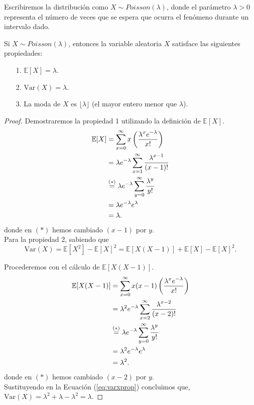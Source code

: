 \documentclass[oneside,openright,titlepage,numbers=noenddot,openany,headinclude,footinclude=true,
cleardoublepage=empty,abstractoff,BCOR=5mm,paper=a4,fontsize=12pt,main=spanish]{scrreprt}
\begin{document}
Escribiremos la distribución como $X \sim Poisson(\lambda)$, donde el parámetro $\lambda > 0$ representa el número de veces que se espera que ocurra el fenómeno durante un intervalo dado.\\


\begin{proposition}
Si $X \sim Poisson(\lambda)$, entonces la variable aleatoria $X$ satisface las siguientes propiedades:
\begin{itemize}
    \item[1.] $\mathbb{E}[X]=\lambda$.
    \item[2.] $\text{Var}(X)=\lambda$.
    \item[3.] La moda de $X$ es $\lfloor \lambda \rfloor$ (el mayor entero menor que $\lambda$).
\end{itemize}
\end{proposition}

\begin{proof}
  Demostraremos la propiedad 1 utilizando la definición de $\mathbb{E}[X]$. \\
  \begin{equation*}
  \begin{split}
  \mathbb{E}[X]&=\sum_{x=0}^\infty x \left(\frac{\displaystyle \lambda^x e^{-\lambda}}{\displaystyle x!}\right)\\
  &=\lambda e^{-\lambda} \sum_{x=1}^\infty \frac{\displaystyle \lambda^{x-1}}{\displaystyle (x-1)!}\\
  &\overset{(*)}{=}\lambda e^{-\lambda} \sum_{y=0}^\infty \frac{\displaystyle \lambda^{y}}{\displaystyle y!}\\
  &=\lambda e^{-\lambda} e^{\lambda}\\
  &=\lambda.
  \end{split}
  \end{equation*} donde en $(*)$ hemos cambiado $(x-1)$ por $y$.\\
  
  Para la propiedad 2, sabiendo que
  \begin{equation}\label{eq:varxprop}
    \text{Var}(X)=\mathbb{E}[X^2]-\mathbb{E}[X]^2=\mathbb{E}[X(X-1)]+\mathbb{E}[X]-\mathbb{E}[X]^2.
  \end{equation}
  
  Procederemos con el cálculo de $\mathbb{E}[X(X-1)]$. \begin{equation*}
  \begin{split}
 \mathbb{E}[X(X-1)]&=\sum_{x=0}^\infty x(x-1)\left(\frac{\displaystyle \lambda^x e^{-\lambda}}{\displaystyle x!}\right)\\
 &=\lambda^2 e^{-\lambda} \sum_{x=2}^\infty \frac{\displaystyle \lambda^{x-2}}{\displaystyle (x-2)!}\\ &\overset{(*)}{=}\lambda e^{-\lambda} \sum_{y=0}^\infty \frac{\displaystyle \lambda^{y}}{\displaystyle y!}\\
 &=\lambda^2 e^{-\lambda} e^{\lambda}\\
 &=\lambda^2.
  \end{split}
  \end{equation*} donde en $(*)$ hemos cambiado $(x-2)$ por $y$.\\
  
  Sustituyendo en la Ecuación (\ref{eq:varxprop}) concluimos que, $\text{Var}(X)=\lambda^2+\lambda-\lambda^2=\lambda.$
\end{proof}\
\end{document}
